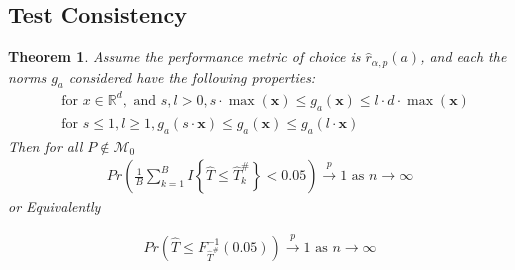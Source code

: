 \documentclass{article}
\newtheorem{theorem}{Theorem}
\begin{document}
\subsection{Test Consistency}
\label{sec:test_cnsty}

\begin{theorem}
\label{thm:cnst}
Assume the performance metric of choice is $\hat{r}_{\alpha, p}(a)$, and each the norms $g_a$ considered have the following properties: 
\begin{align}
& \text{for } x \in \mathbb{R}^d, \text{ and } s, l > 0, s \cdot \max({\boldsymbol{x}}) \leq g_a(\boldsymbol{x}) \leq l \cdot d \cdot \max({\boldsymbol{x}}) \label{eqn:nrm_bounds}\\
& \text{for } s \leq 1, l \geq 1, g_a(s \cdot \boldsymbol{x}) \leq g_a(\boldsymbol{x}) \leq g_a(l \cdot \boldsymbol{x}) \label{eqn:linegrowth}
\end{align}
Then for all $P \not \in \mathscr{M}_0$ 
\begin{align*}
	Pr \left(\frac{1}{B}\sum_{k = 1}^B I\left\{\hat{T} \leq \hat{T}_k^{\#}\right\} < 0.05\right) \xrightarrow{p} 1 \text{ as } n \to \infty
\end{align*}
or Equivalently 

\begin{align*}
Pr\left(\hat{T} \leq F^{-1}_{\hat{T}^\#}(0.05)\right) \xrightarrow{p} 1 \text{ as } n \to \infty
\end{align*}
\end{theorem}
\end{document}
